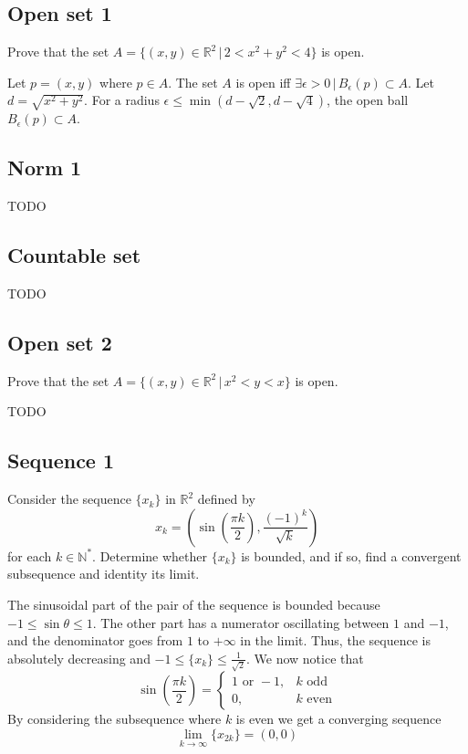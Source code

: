 \documentclass[a4paper]{article}
\begin{document}
\subsection{Open set 1}

Prove that the set \(A=\{(x,y) \in {\mathbb{R}}^2 \,|\, 2<x^2+y^2<4\}\)
is open.

Let \(p = (x,y)\) where \(p \in A\).
The set \(A\) is open iff \(\exists \epsilon > 0 \,|\, B_\epsilon(p) \subset A \).
Let \(d = \sqrt{x^2 + y^2}\). For a radius \(\epsilon \leq \min(d-\sqrt{2}, d-\sqrt{4})\),
the open ball \(B_\epsilon(p) \subset A\).

\subsection{Norm 1}

TODO

\subsection{Countable set}

TODO %

\subsection{Open set 2}

Prove that the set \(A=\{(x,y) \in {\mathbb{R}}^2 \,|\, x^2<y<x\}\)
is open.

TODO

\subsection{Sequence 1}

Consider the sequence \(\{x_k\}\) in \({\mathbb{R}}^2\)
defined by \[ x_k = \left( \sin\left(\frac{\pi k}{2}\right), \frac{{(-1)}^k}{\sqrt{k}} \right) \]
for each \(k \in {\mathbb{N}}^*\).
Determine whether \(\{x_k\}\) is bounded, and if so, find a convergent subsequence
and identity its limit.

The sinusoidal part of the pair of the sequence is bounded because \(-1 \leq \sin\theta \leq 1\).
The other part has a numerator oscillating between \(1\) and \(-1\),
and the denominator goes from \(1\) to \(+\infty\) in the limit.
Thus, the sequence is absolutely decreasing and \(-1 \leq \{x_k\} \leq \frac{1}{\sqrt{2}}\).
We now notice that
\[
    \sin\left(\frac{\pi k}{2}\right)
    = \begin{cases}
        1 \text{ or } -1, & k \text{ odd} \\
        0, & k \text{ even}
    \end{cases}
\]
By considering the subsequence where \(k\) is even we get a converging sequence
\[
    \lim_{k \to \infty} \{x_{2k}\} = (0, 0) 
\]
\end{document}
